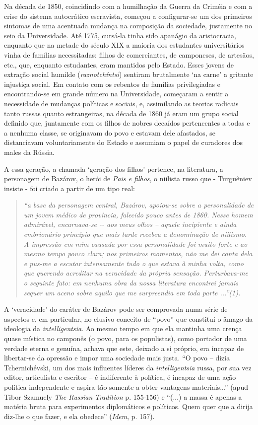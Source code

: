 Na década de 1850, coincidindo com a humilhação da Guerra da Criméia e
com a crise do sistema autocrático escravista, começou a configurar-se
um dos primeiros sintomas de uma acentuada mudança na composição da
sociedade, justamente no seio da Universidade. Até 1775, cursá-la tinha
sido apanágio da aristocracia, enquanto que na metade do século XIX a
maioria dos estudantes universitários vinha de famílias necessitadas:
filhos de comerciantes, de camponeses, de artesãos, etc., que, enquanto
estudantes, eram mantidos pelo Estado. Esses jovens de extração social
humilde (\emph{raznotchíntsi}) sentiram brutalmente `na carne' a
gritante injustiça social. Em contato com os rebentos de famílias
privilegiadas e encontrando-se em grande número na Universidade,
começaram a sentir a necessidade de mudanças políticas e sociais, e,
assimilando as teorias radicais tanto russas quanto estrangeiras, na
década de 1860 já eram um grupo social definido que, juntamente com os
filhos de nobres decaídos pertencentes a todas e a nenhuma classe, se
originavam do povo e estavam dele afastados, se distanciavam
voluntariamente do Estado e assumiam o papel de curadores dos males da
Rússia.

A essa geração, a chamada `geração dos filhos' pertence, na literatura,
a personagem de Bazárov, o herói de \emph{Pais e filhos}, o niilista
russo que - Turguêniev insiste - foi criado a partir de um tipo real:

\begin{quote}
\emph{``a base da personagem central, Bazárov, apoiou-se sobre a
personalidade de um jovem médico de província, falecido pouco antes de
1860. Nesse homem admirável, encarnava-se -\/- aos meus olhos -- aquele
incipiente e ainda embrionário princípio que mais tarde recebeu a
denominação de niilismo. A impressão em mim causada por essa
personalidade foi muito forte e ao mesmo tempo pouco clara; nos
primeiros momentos, não me dei conta dela e pus-me a escutar
intensamente tudo o que estava à minha volta, como que querendo
acreditar na veracidade da própria sensação. Perturbava-me o seguinte
fato: em nenhuma obra da nossa literatura encontrei jamais sequer um
aceno sobre aquilo que me surpreendia em toda parte ...''(1).}
\end{quote}

A `veracidade' do caráter de Bazárov pode ser comprovada numa série de
aspectos e, em particular, no elusivo conceito de ``povo'' que constitui
o âmago da ideologia da \emph{intelligentsia}. Ao mesmo tempo em que ela
mantinha uma crença quase mística no camponês (o povo, para os
populistas), como portador de uma verdade eterna e genuína, achava que
este, deixado a si próprio, era incapaz de libertar-se da opressão e
impor uma sociedade mais justa. ``O povo -- dizia Tchernichévski, um dos
mais influentes líderes da \emph{intelligentsia} russa, por sua vez
editor, articulista e escritor -- é indiferente à política, é incapaz de
uma ação política independente e aspira tão somente a obter vantagens
materiais...'' (apud Tibor Szamuely \emph{The Russian} { }
\emph{Tradition} p. 155-156) e ``(...) a massa é apenas a matéria bruta
para experimentos diplomáticos e políticos. Quem quer que a dirija
diz-lhe o que fazer, e ela obedece'' (\emph{Idem}, p. 157).

